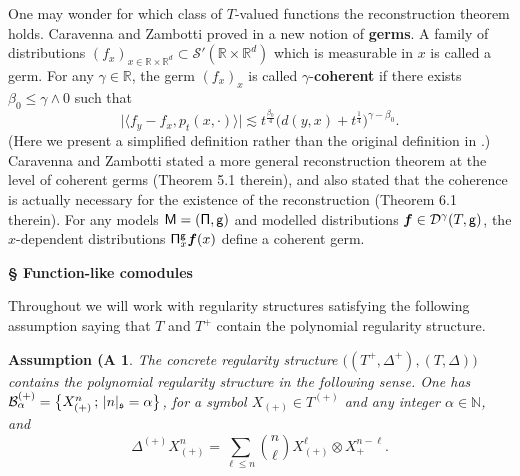 \documentclass[10pt, reqno]{amsart}
\numberwithin{subsection}{section}
\numberwithin{subsubsection}{subsection}
\numberwithin{equation}{section} %
\newenvironment{Rem}[1][\unskip]{%
    \begin{list}{\hspace{1.15cm}{\textsf{\textbf{{\small \textsl{Remark}} 
--}}}}{%
        \setlength{\topsep}{0pt}%
        \setlength{\leftmargin}{0pt}%
        \setlength{\rightmargin}{0pt}%
        \setlength{\listparindent}{0pt}%
        \setlength{\itemindent}{0pt}%
        \setlength{\parsep}{0pt}%
        \addtolength{\leftmargin}{0pt}%
        \addtolength{\rightmargin}{0pt}%
    } \item }{\hfill \end{list}\smallskip}
\theoremstyle{mystyle}
\theoremstyle{mystyle2}
\theoremstyle{mystyle3}
\newtheorem{assumA}{Assumption (A}
\newcommand{\bsf}{\boldsymbol{f}}
\newcommand{\ssk}{\smallskip}
\newcommand\bbN{\mathbb{N}}
\newcommand\bbR{\mathbb{R}}
\newcommand{\mcB}{\mathcal{B}}
\newcommand{\mcD}{\mathcal{D}}
\newcommand\mcS{\mathcal{S}}
\newcommand{\Xplus}{X_+}
\begin{document}
{\small {\sl \begin{Rem} One may wonder for which class of $T$-valued functions the reconstruction theorem holds. Caravenna and Zambotti proved in \cite{CaravennaZambotti} a new notion of \textbf{\textsf{germs}}. A family of distributions $(f_x)_{x\in\bbR\times\bbR^d}\subset\mcS'(\bbR\times\bbR^d)$ which is measurable in $x$ is called a germ. For any $\gamma\in\bbR$, the germ $(f_x)_x$ is called $\gamma$-\textbf{\textsf{coherent}} if there exists $\beta_0\le\gamma\wedge0$ such that
$$
\big\vert\big\langle f_y-f_x,p_t(x,\cdot)\big\rangle\big\vert\lesssim t^{\frac{\beta_0}4}\big(d(y,x)+t^{\frac14}\big)^{\gamma-\beta_0}.
$$
(Here we present a simplified definition rather than the original definition in \cite{CaravennaZambotti}.) Caravenna and Zambotti \cite{CaravennaZambotti} stated a more general reconstruction theorem at the level of coherent germs (Theorem 5.1 therein), and also stated that the coherence is actually necessary for the existence of the reconstruction (Theorem 6.1 therein). For any models $\sf M=(\Pi,g)$ and modelled distributions $\bsf\in\mcD^\gamma(T,{\sf g})$, the $x$-dependent  distributions ${\sf\Pi}_x^{\sf g}\bsf(x)$ define a coherent germ.
\end{Rem} }}   



\bigskip



\hfill \textsf{\textbf{ {\Large \S} Function-like comodules}}

\medskip

Throughout we will work with regularity structures satisfying the following assumption saying that $T$ and $T^+$ contain the polynomial regularity 
structure.

\medskip

\begin{assumA}\label{A1}
The concrete regularity structure $\big((T^+,\Delta^+),(T,\Delta)\big)$ contains the polynomial regularity structure in the following sense. One has $\mcB_\alpha^{(+)} = \big\{X^n_{(+)}\,;\,\vert 
n\vert_{\frak{s}}=\alpha\big\}$, for a symbol $X_{(+)}\in T^{(+)}$ and any integer $\alpha\in\bbN$, and 
$$
\Delta^{(+)} X_{(+)}^n = \sum_{\ell\leq n} \binom{n}{\ell} X_{(+)}^\ell\otimes \Xplus^{n-\ell}.
$$
\end{assumA}

\ssk
\end{document}

